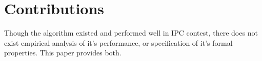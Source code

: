 

\section{Contributions} 
Though the algorithm existed and performed well in IPC contest, there does not exist empirical analysis of it's performance, or specification of it's formal properties. This paper provides both.



